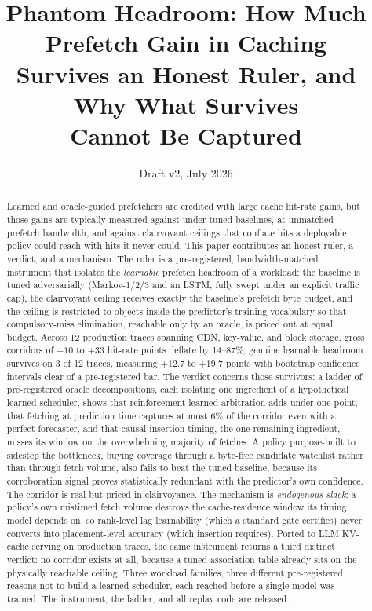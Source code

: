 \documentclass[11pt]{article}
\title{\vspace{-3em}\textbf{Phantom Headroom: How Much Prefetch Gain in Caching\\ Survives an Honest Ruler, and Why What Survives\\ Cannot Be Captured}}
\author{}
\date{Draft v2, July 2026}
\begin{document}
\maketitle
\vspace{-3em}

\begin{abstract}
\noindent Learned and oracle-guided prefetchers are credited with large cache hit-rate gains, but those gains are typically measured against under-tuned baselines, at unmatched prefetch bandwidth, and against clairvoyant ceilings that conflate hits a deployable policy could reach with hits it never could. This paper contributes an honest ruler, a verdict, and a mechanism. The ruler is a pre-registered, bandwidth-matched instrument that isolates the \emph{learnable} prefetch headroom of a workload: the baseline is tuned adversarially (Markov-1/2/3 and an LSTM, fully swept under an explicit traffic cap), the clairvoyant ceiling receives exactly the baseline's prefetch byte budget, and the ceiling is restricted to objects inside the predictor's training vocabulary so that compulsory-miss elimination, reachable only by an oracle, is priced out at equal budget. Across 12 production traces spanning CDN, key-value, and block storage, gross corridors of $+10$ to $+33$ hit-rate points deflate by 14--87\%; genuine learnable headroom survives on 3 of 12 traces, measuring $+12.7$ to $+19.7$ points with bootstrap confidence intervals clear of a pre-registered bar. The verdict concerns those survivors: a ladder of pre-registered oracle decompositions, each isolating one ingredient of a hypothetical learned scheduler, shows that reinforcement-learned arbitration adds under one point, that fetching at prediction time captures at most 6\% of the corridor even with a perfect forecaster, and that causal insertion timing, the one remaining ingredient, misses its window on the overwhelming majority of fetches. A policy purpose-built to sidestep the bottleneck, buying coverage through a byte-free candidate watchlist rather than through fetch volume, also fails to beat the tuned baseline, because its corroboration signal proves statistically redundant with the predictor's own confidence. The corridor is real but priced in clairvoyance. The mechanism is \emph{endogenous slack}: a policy's own mistimed fetch volume destroys the cache-residence window its timing model depends on, so rank-level lag learnability (which a standard gate certifies) never converts into placement-level accuracy (which insertion requires). Ported to LLM KV-cache serving on production traces, the same instrument returns a third distinct verdict: no corridor exists at all, because a tuned association table already sits on the physically reachable ceiling. Three workload families, three different pre-registered reasons not to build a learned scheduler, each reached before a single model was trained. The instrument, the ladder, and all replay code are released.
\end{abstract}
\end{document}

